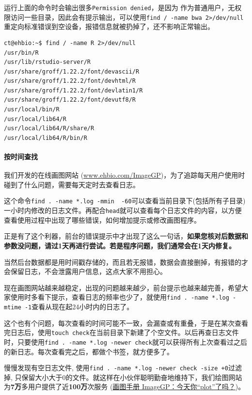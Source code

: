 \documentclass[]{article}
\numberwithin{figure}{section}
\numberwithin{table}{section}
\begin{document}
运行上面的命令时会输出很多\texttt{Permission\ denied}，是因为 作为普通用户，无权限访问一些目录，因此会有提示输出，可以使用\texttt{find\ /\ -name\ bwa\ 2\textgreater{}/dev/null}重定向标准错误到空设备，报错信息就被扔掉了，还不影响正常输出。

\begin{verbatim}
ct@ehbio:~$ find / -name R 2>/dev/null
/usr/bin/R
/usr/lib/rstudio-server/R
/usr/share/groff/1.22.2/font/devascii/R
/usr/share/groff/1.22.2/font/devhtml/R
/usr/share/groff/1.22.2/font/devlatin1/R
/usr/share/groff/1.22.2/font/devutf8/R
/usr/local/bin/R
/usr/local/lib64/R
/usr/local/lib64/R/share/R
/usr/local/lib64/R/bin/R
\end{verbatim}

\hypertarget{find_by_time}{%
\paragraph{按时间查找}\label{find_by_time}}

我们开发的在线画图网站 (\href{http://mp.weixin.qq.com/s/pTHHqxuf0y1MCCCBaZjt9A}{www.ehbio.com/ImageGP})，为了追踪每天用户使用时碰到了什么问题，需要每天定时去查看日志。

这个命令\texttt{find\ .\ -name\ *.log\ -mmin\ \ -60}可以查看当前目录下(包括所有子目录)一小时内修改的日志文件。再配合\texttt{head}就可以查看每个日志文件的内容，以方便查看使用过程中出现了哪些错误，如何增加提示或修改画图程序。

正是有了这个利器，前台的错误提示中才出现了这么一句话，\textbf{如果您核对后数据和参数没问题，请过1天再进行尝试。若是程序问题，我们通常会在1天内修复。}

当然后台数据都是用时间戳存储的，而且若无报错，数据会直接删掉，有报错的才会保留日志，不会泄露用户信息，这点大家不用担心。

现在画图网站越来越稳定，出现的问题越来越少，前台提示也越来越完善，希望大家使用时多看下提示，查看日志的频率也少了，就使用\texttt{find\ .\ -name\ *.log\ -mtime\ -1}查看从现在起24小时内的日志了。

这个也有个问题，每次查看的时间可能不一致，会漏查或有重叠，于是在某次查看完日志后，使用\texttt{touch\ check}在当前目录下新建了个空文件。以后再查日志文件时，只要使用\texttt{find\ .\ -name\ *.log\ -newer\ check}就可以获得所有上次查看过之后的新日志。每次查看完之后，都做个书签，就方便多了。

慢慢发现有空日志文件, 使用\texttt{find\ .\ -name\ *.log\ -newer\ check\ -size\ +0}过滤掉, 只保留大小大于0的文件。就这样在小伙伴聪明勤奋地维持下，我们绘图网站为\textbf{7万}多用户提供了近\textbf{100万}次服务 (\href{https://mp.weixin.qq.com/s/ekTLcXSJh14Bm3PtVc9Mpg}{画图手册 \textbar{} ImageGP：今天你``plot''了吗？})。
\end{document}

